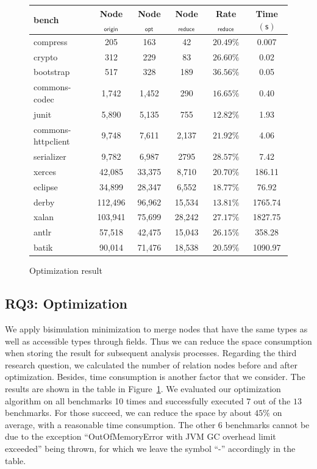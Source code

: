 \documentclass{llncs}
\begin{document}
\begin{figure}[t!]
  \centering
\begin{tabular}{lccccc}
	\hline
	\textbf{bench} & \textbf{Node$_{\textsf{origin}}$} & \textbf{Node$_{\textsf{opt}}$} & \textbf{Node$_{\textsf{reduce}}$} & \textbf{Rate$_{\textsf{reduce}}$} & \hspace{2pt}\textbf{Time$(\textsf{s})$} \\
	\hline
	compress & 205 & 163 & 42 & $20.49\%$ & 0.007 \\
	crypto & 312 & 229 & 83 & $26.60\%$ & 0.02 \\
	bootstrap & 517 & 328 & 189 & $36.56\%$ & 0.05 \\
	commons-codec & 1,742 & 1,452 & 290 & $16.65\%$ & 0.40 \\
	junit & 5,890 & 5,135 & 755 & $12.82\%$ & 1.93 \\
	commons-httpclient & 9,748 & 7,611 & 2,137 & $21.92\%$ & 4.06 \\
	serializer & 9,782 & 6,987 & 2795 & $28.57\%$ & 7.42 \\
	xerces & 42,085 & 33,375 & 8,710 & $20.70\%$ & 186.11\\
	eclipse & 34,899 & 28,347 & 6,552 & $18.77\%$ & 76.92\\
	derby & 112,496 & 96,962 & 15,534 & $13.81\%$ & 1765.74\\
	xalan & 103,941 & 75,699 & 28,242 & $27.17\%$ & 1827.75\\
	antlr & 57,518 & 42,475 & 15,043 & $26.15\%$ & 358.28\\
	batik & 90,014 & 71,476 & 18,538 & $20.59\%$ & 1090.97\\
	\hline
\end{tabular}
\caption{Optimization result}
\label{experiment:Optimalization}
\end{figure}


\subsection{RQ3: Optimization}\label{subsec:optimization}

We apply bisimulation minimization to merge nodes that have the same types as well as accessible types through fields. Thus we can reduce the space consumption when storing the result for subsequent analysis processes. Regarding the third research question, we calculated the number of relation nodes before and after optimization. Besides, time consumption is another factor that we consider. The results are shown in the table in Figure~\ref{experiment:Optimalization}. We evaluated our optimization algorithm on all benchmarks 10 times and successfully executed $7$ out of the $13$ benchmarks. For those succeed, we can reduce the space by about $45\%$ on average, with a reasonable time consumption. The other $6$ benchmarks cannot be due to the exception ``OutOfMemoryError with JVM GC overhead limit exceeded'' being thrown, for which we leave the symbol ``-'' accordingly in the table.
\end{document}
